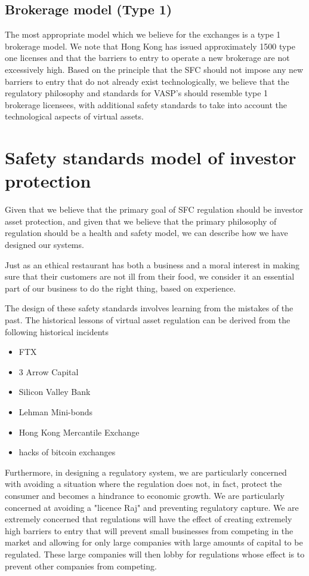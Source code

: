 \subsection{Brokerage model (Type 1)}

The most appropriate model which we believe for the exchanges is a
type 1 brokerage model. We note that Hong Kong has issued
approximately 1500 type one licenses and that the barriers to entry to
operate a new brokerage are not excessively high.  Based on the
principle that the SFC should not impose any new barriers to entry
that do not already exist technologically, we believe that the
regulatory philosophy and standards for VASP's should resemble type 1
brokerage licensees, with additional safety standards to take into
account the technological aspects of virtual assets.

\section{Safety standards model of investor protection}

Given that we believe that the primary goal of SFC regulation should be
investor asset protection, and given that we believe that the primary
philosophy of regulation should be a health and safety model, we can
describe how we have designed our systems.

Just as an ethical restaurant has both a business and a moral interest
in making sure that their customers are not ill from their food, we
consider it an essential part of our business to do the right thing,
based on experience.

The design of these safety standards involves learning from the
mistakes of the past.  The historical lessons of virtual asset
regulation can be derived from the following historical incidents

\begin{itemize}
\item FTX
\item  3 Arrow Capital
\item Silicon Valley Bank
\item Lehman Mini-bonds
\item Hong Kong Mercantile Exchange
\item hacks of bitcoin exchanges
  \end{itemize}

Furthermore, in designing a regulatory system, we are particularly
concerned with avoiding a situation where the regulation does not, in fact,
protect the consumer and becomes a hindrance to economic growth.  We
are particularly concerned at avoiding a "licence Raj" and preventing
regulatory capture.  We are extremely concerned that regulations will
have the effect of creating extremely high barriers to entry that will
prevent small businesses from competing in the market and allowing for
only large companies with large amounts of capital to be regulated.
These large companies will then lobby for regulations whose effect is
to prevent other companies from competing.

